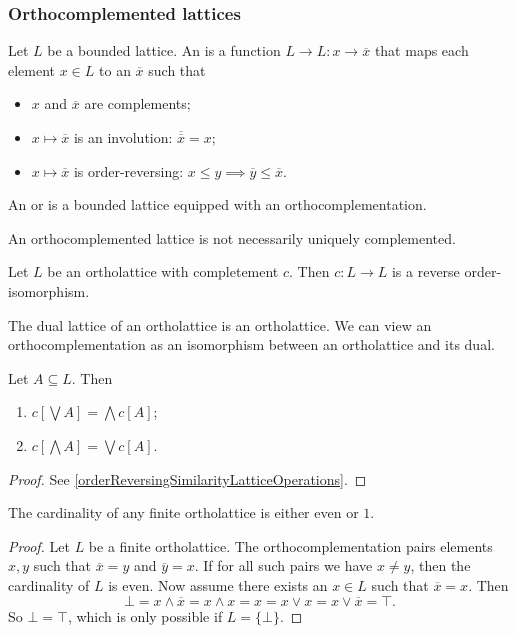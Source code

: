\subsubsection{Orthocomplemented lattices}
\begin{definition}
Let $L$ be a bounded lattice. An  is a function $L \to L: x \to \overline{x}$ that maps each element $x\in L$ to an  $\overline{x}$ such that
\begin{itemize}
\item $x$ and $\overline{x}$ are complements;
\item $x\mapsto \overline{x}$ is an involution: $\overline{\overline{x}} = x$;
\item $x\mapsto \overline{x}$ is order-reversing: $x\leq y \implies \overline{y} \leq \overline{x}$.
\end{itemize}
An  or  is a bounded lattice equipped with an orthocomplementation.
\end{definition}
An orthocomplemented lattice is not necessarily uniquely complemented.

\begin{lemma}
Let $L$ be an ortholattice with completement $c$. Then $c: L \to L$ is a reverse order-isomorphism.
\end{lemma}
\begin{corollary}
The dual lattice of an ortholattice is an ortholattice. We can view an orthocomplementation as an isomorphism between an ortholattice and its dual.
\end{corollary}
\begin{corollary}
Let $A\subseteq L$. Then
\begin{enumerate}
\item $c\left[\bigvee A\right] = \bigwedge c[A]$;
\item $c\left[\bigwedge A\right] = \bigvee c[A]$.
\end{enumerate}
\end{corollary}
\begin{proof}
See \ref{orderReversingSimilarityLatticeOperations}.
\end{proof}

\begin{proposition}
The cardinality of any finite ortholattice is either even or $1$.
\end{proposition}
\begin{proof}
Let $L$ be a finite ortholattice.
The orthocomplementation pairs elements $x,y$ such that $\overline{x} = y$ and $\overline{y} = x$. If for all such pairs we have $x\neq y$, then the cardinality of $L$ is even. Now assume there exists an $x\in L$ such that $\overline{x} = x$. Then 
\[ \bot = x\wedge \overline{x} = x\wedge x = x = x\vee x = x\vee \overline{x} = \top. \]
So $\bot = \top$, which is only possible if $L = \{\bot\}$.
\end{proof}

